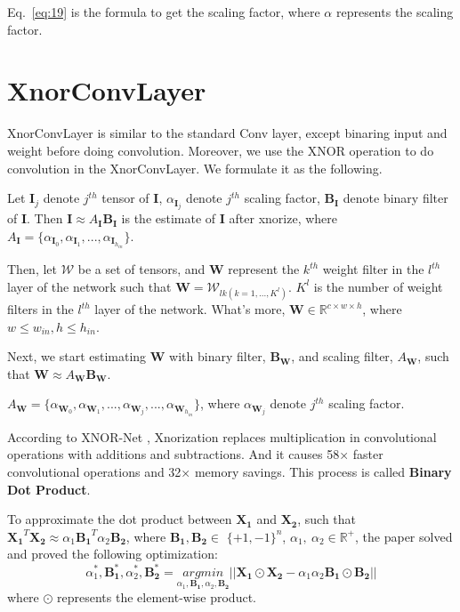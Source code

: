 \documentclass[sn-mathphys,iicol,Numbered]{sn-jnl}
\begin{document}
\begin{appendices}
Eq.~\ref{eq:19} is the formula to get the scaling factor, where $\alpha$ represents the scaling factor. 

\section{XnorConvLayer}
\label{appendix:B}

XnorConvLayer is similar to the standard Conv layer, except binaring input and weight before doing convolution. Moreover, we use the XNOR operation to do convolution in the XnorConvLayer. We formulate it as the following.

Let $\mathbf{I}_{j}$ denote $j^{th}$ tensor of $\mathbf{I}$, $\alpha_{\mathbf{I}_{j}}$ denote $j^{th}$ scaling factor, $\mathbf{B_{I}}$ denote binary filter of $\mathbf{I}$. Then $\mathbf{I}\approx A_{\mathbf{I}}\mathbf{B_{I}}$ is the estimate of $\mathbf{I}$ after xnorize, where $A_{\mathbf{I}}=\{ \alpha_{\mathbf{I}_{0}}, \alpha_{\mathbf{I}_{1}},..., \alpha_{\mathbf{I}_{h_{in}}}\}$. 

Then, let $\mathcal{W}$ be a set of tensors, and $\mathbf{W}$ represent the $k^{th}$ weight filter in the $l^{th}$ layer of the network such that $\mathbf{W}=\mathcal{W}_{lk(k=1,...,K^{l})}$. $K^{l}$ is the number of weight filters in the $l^{th}$ layer of the network. What's more, $\mathbf{W}\in\mathbb{R}^{c\times w\times h}$, where $w\leq w_{in}, h\leq h_{in}$. 

Next, we start estimating $\mathbf{W}$ with binary filter, $\mathbf{B_{W}}$, and scaling filter, $A_{\mathbf{W}}$, such that $\mathbf{W}\approx A_{\mathbf{W}}\mathbf{B_{W}}$.

$A_{\mathbf{W}}=\{ \alpha_{\mathbf{W}_{0}}, \alpha_{\mathbf{W}_{1}},..., \alpha_{\mathbf{W}_{j}}, ..., \alpha_{\mathbf{W}_{h_{in}}}\}$, where $\alpha_{\mathbf{W}_{j}}$ denote $j^{th}$ scaling factor.

According to XNOR-Net \citep{A2_xnor}, Xnorization replaces multiplication in convolutional operations with additions and subtractions. And it causes 58× faster convolutional operations and 32× memory savings. This process is called \textbf{Binary Dot Product}.

To approximate the dot product between $\mathbf{X_{1}}$ and $\mathbf{X_{2}}$, such that $\mathbf{X_{1}}^{T}\mathbf{X_{2}}\approx \alpha_{1}\mathbf{B_{1}}^{T}\alpha_{2}\mathbf{B_{2}}$, where $\mathbf{B_{1}},\mathbf{B_{2}}\in$ $\{+1, -1\}^{n}$, $\alpha_{1},\ \alpha_{2}\in \mathbb{R}^{+}$, the paper solved and proved the following optimization:
\vspace{-0.2cm}
\begin{equation} \label{eq:20}
\alpha_{1}^{*},\mathbf{B_{1}^{*}},\alpha_{2}^{*},\mathbf{B_{2}^{*}}= \underset{\alpha_{1},\mathbf{B_{1}},\alpha_{2},\mathbf{B_{2}}}{argmin}||\mathbf{X_{1}}\odot\mathbf{X_{2}} - \alpha_{1}\alpha_{2}\mathbf{B_{1}}\odot\mathbf{B_{2}}||
\end{equation}
where $\odot$ represents the element-wise product.


\end{appendices}
\end{document}
